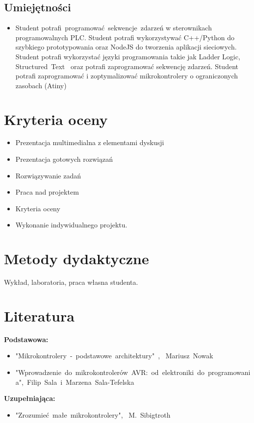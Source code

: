 \documentclass[12pt, a4paper]{article}
\begin{document}
\subsection*{Umiejętności}
\begin{itemize}
  \item Student potrafi programować sekwencje zdarzeń w sterownikach programowalnych PLC. Student potrafi wykorzystywać C++/Python do szybkiego prototypowania oraz NodeJS do tworzenia aplikacji sieciowych. Student potrafi wykorzystać języki programowania takie jak Ladder Logic, Structured Text  oraz potrafi zaprogramować sekwencję zdarzeń.  Student potrafi zaprogramować i zoptymalizować mikrokontrolery o ograniczonych zasobach (Atiny)
\end{itemize}

\section{Kryteria oceny}

\begin{itemize}
  \item Prezentacja multimedialna z elementami dyskusji
  \item Prezentacja gotowych rozwiązań
  \item Rozwiązywanie zadań
  \item Praca nad projektem
  \item Kryteria oceny
  \item Wykonanie indywidualnego projektu.
\end{itemize}

\section{Metody dydaktyczne}

Wykład, laboratoria, praca własna studenta.

\section{Literatura}

\textbf{Podstawowa:}
\begin{itemize}
  \item "Mikrokontrolery - podstawowe architektury" ,  Mariusz Nowak
  \item "Wprowadzenie do mikrokontrolerów AVR: od elektroniki do programowania", Filip Sala i Marzena Sala-Tefelska
\end{itemize}

\textbf{Uzupełniająca:}
\begin{itemize}
  \item "Zrozumieć małe mikrokontrolery",  M. Sibigtroth
\end{itemize}
\end{document}
